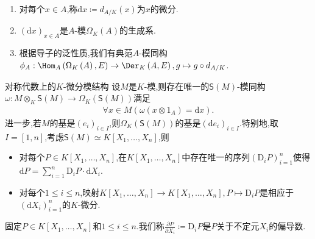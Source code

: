 \begin{remark}{}{}
	\begin{enumerate}
		\item 对每个$x\in A$,称$\mathrm{d}x\coloneq d_{A/K}\left(x\right)$为$x$的微分.
		\item $\left(\mathrm{d}x\right)_{x\in A}$是$A$-模$\Omega_{K}\left(A\right)$的生成系.
		\item 根据导子的泛性质,我们有典范$A$-模同构$\phi_{A}:\Hom_{A}\left(\Omega_{K}\left(A\right),E\right)\to\Der_{K}\left(A,E\right),g\mapsto g\circ d_{A/K}$.
	\end{enumerate}
\end{remark}

\begin{example}{对称代数上的$K$-微分模结构}{}
	设$M$是$K$-模,则存在唯一的$\mathsf{S}\left(M\right)$-模同构$\omega:M\otimes_{K}\mathsf{S}\left(M\right)\to\Omega_{K}\left(\mathsf{S}\left(M\right)\right)$满足
	\begin{align*}
		\forall x\in M\left(\omega\left(x\otimes 1_{A}\right)=\mathrm{d}x\right).
	\end{align*}
	进一步,若$M$的基是$\left(e_{i}\right)_{i\in I}$,则$\Omega_{K}\left(\mathsf{S}\left(M\right)\right)$的基是$\left(\mathrm{d}e_{i}\right)_{i\in I}$.特别地,取$I=\left[1,n\right]$,考虑$\mathsf{S}\left(M\right)\simeq K\left[X_{1},\ldots,X_{n}\right]$,则
	\begin{itemize}
		\item 对每个$P\in K\left[X_{1},\ldots,X_{n}\right]$,在$K\left[X_{1},\ldots,X_{n}\right]$中存在唯一的序列$\left(\mathrm{D}_{i}P\right)_{i=1}^{n}$使得$\mathrm{d}P=\sum\limits_{i=1}^{n}\mathrm{D}_{i}P\cdot\mathrm{d}X_{i}$.
		\item 对每个$1\leq i\leq n$,映射$K\left[X_{1},\ldots,X_{n}\right]\to K\left[X_{1},\ldots,X_{n}\right],P\mapsto\mathrm{D}_{i}P$是相应于$\left(\mathrm{d}X_{i}\right)_{i=1}^{n}$的$K$-微分.
	\end{itemize}
	固定$P\in K\left[X_{1},\ldots,X_{n}\right]$和$1\leq i\leq n$.我们称$\frac{\partial P}{\partial X_{i}}\coloneq\mathrm{D}_{i}P$是$P$关于不定元$X_{i}$的偏导数.
\end{example}




















